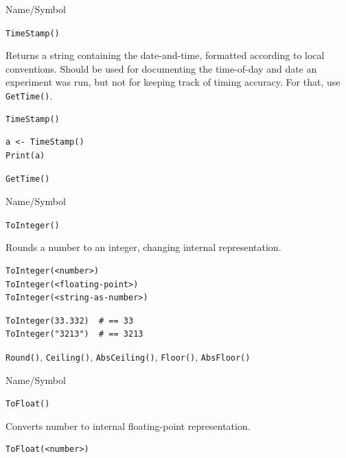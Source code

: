 \begin{desc}{Name/Symbol}
\item[Name/Symbol]  	\verb+TimeStamp()+

\item[Description] Returns a string containing the date-and-time,
  formatted according to local conventions. Should be used for
  documenting the time-of-day and date an experiment was run, but not
  for keeping track of timing accuracy.  For that, use
  \verb+GetTime()+.
	     
\item[Usage]
\begin{verbatim}
TimeStamp()
\end{verbatim}

\item[Example]
\begin{verbatim}
a <- TimeStamp()
Print(a)
\end{verbatim}

\item[See Also]     	\verb+GetTime()+
\end{desc}




\begin{desc}{Name/Symbol}
\item[Name/Symbol]  	\verb+ToInteger()+
              
\item[Description]  	Rounds a number to an integer, changing internal 
		representation.

\item[Usage]
\begin{verbatim}
ToInteger(<number>)
ToInteger(<floating-point>)
ToInteger(<string-as-number>)
\end{verbatim}

\item[Example]
\begin{verbatim}
ToInteger(33.332)  # == 33
ToInteger("3213")  # == 3213
\end{verbatim}

\item[See Also]    	\verb+Round()+, \verb+Ceiling()+, \verb+AbsCeiling()+, \verb+Floor()+, \verb+AbsFloor()+
\end{desc}




\begin{desc}{Name/Symbol}
\item[Name/Symbol]  	\verb+ToFloat()+

\item[Description] 	Converts number to internal floating-point representation.

\item[Usage]
\begin{verbatim}
ToFloat(<number>)
\end{verbatim}

\item[Example]	

\item[See Also]	
\end{desc}




